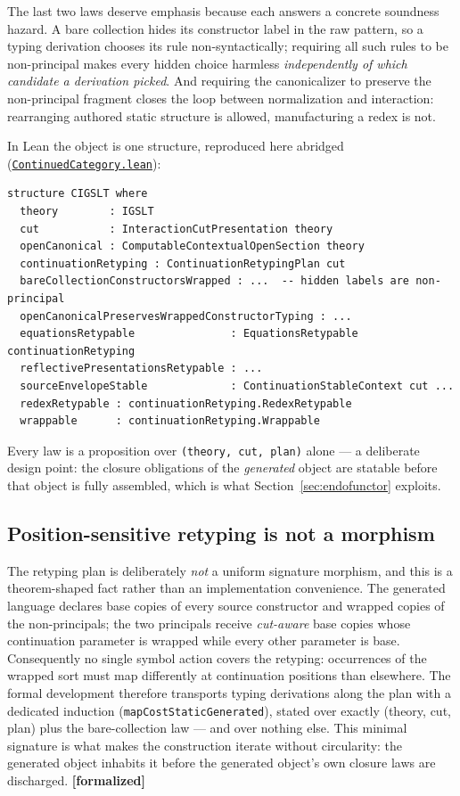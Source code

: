 \documentclass[11pt]{article}
\newcommand{\leanfile}[2]{\href{https://github.com/zariuq/MeTTapedia/blob/main/lean/mettapedia/Mettapedia/#1}{\code{#2}}}
\newcommand{\code}[1]{\texttt{#1}}
\newcommand{\formalized}{\textbf{[formalized]}}
\begin{document}
The last two laws deserve emphasis because each answers a concrete
soundness hazard.  A bare collection hides its constructor label in the
raw pattern, so a typing derivation chooses its rule non-syntactically;
requiring all such rules to be non-principal makes every hidden choice
harmless \emph{independently of which candidate a derivation picked}.
And requiring the canonicalizer to preserve the non-principal fragment
closes the loop between normalization and interaction: rearranging
authored static structure is allowed, manufacturing a redex is not.

In Lean the object is one structure, reproduced here abridged
(\leanfile{GSLT/LanguageDef/ContinuedCategory.lean}{ContinuedCategory.lean}):

\begin{lstlisting}
structure CIGSLT where
  theory        : IGSLT
  cut           : InteractionCutPresentation theory
  openCanonical : ComputableContextualOpenSection theory
  continuationRetyping : ContinuationRetypingPlan cut
  bareCollectionConstructorsWrapped : ...  -- hidden labels are non-principal
  openCanonicalPreservesWrappedConstructorTyping : ...
  equationsRetypable               : EquationsRetypable continuationRetyping
  reflectivePresentationsRetypable : ...
  sourceEnvelopeStable             : ContinuationStableContext cut ...
  redexRetypable : continuationRetyping.RedexRetypable
  wrappable      : continuationRetyping.Wrappable
\end{lstlisting}

\noindent
Every law is a proposition over \code{(theory, cut, plan)} alone --- a
deliberate design point: the closure obligations of the \emph{generated}
object are statable before that object is fully assembled, which is what
Section~\ref{sec:endofunctor} exploits.

\subsection{Position-sensitive retyping is not a morphism}

The retyping plan is deliberately \emph{not} a uniform signature
morphism, and this is a theorem-shaped fact rather than an
implementation convenience.  The generated language declares base copies
of every source constructor and wrapped copies of the non-principals;
the two principals receive \emph{cut-aware} base copies whose
continuation parameter is wrapped while every other parameter is base.
Consequently no single symbol action covers the retyping: occurrences of
the wrapped sort must map differently at continuation positions than
elsewhere.  The formal development therefore transports typing
derivations along the plan with a dedicated induction
(\code{mapCostStaticGenerated}), stated over exactly
(theory, cut, plan) plus the bare-collection law --- and over nothing
else.  This minimal signature is what makes the construction iterate
without circularity: the generated object inhabits it before the
generated object's own closure laws are discharged. \formalized
\end{document}
